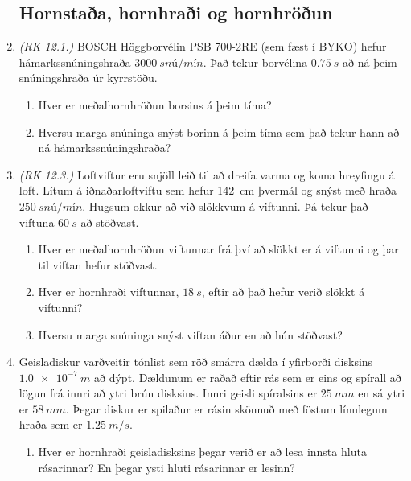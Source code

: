 \begin{enumerate}[label = \textbf{Dæmi \thechapter.\arabic*.}]

\subsection*{Hornstaða, hornhraði og hornhröðun}

\item \textit{(RK 12.1.)} BOSCH Höggborvélin PSB 700-2RE (sem fæst í BYKO) hefur hámarkssnúningshraða $\SI{3000}{snú/mín}$. Það tekur borvélina $\SI{0.75}{s}$ að ná þeim snúningshraða úr kyrrstöðu.
\begin{enumerate}[label = \textbf{(\alph*)}]
    \item Hver er meðalhornhröðun borsins á þeim tíma?
    \item Hversu marga snúninga snýst borinn á þeim tíma sem það tekur hann að ná hámarkssnúningshraða?
\end{enumerate}

\item \textit{(RK 12.3.)} Loftviftur eru snjöll leið til að dreifa varma og koma hreyfingu á loft. Lítum á iðnaðarloftviftu sem hefur \SI{142}{cm} þvermál og snýst með hraða $\SI{250}{snú/mín}$. Hugsum okkur að við slökkvum á viftunni. Þá tekur það viftuna $\SI{60}{s}$ að stöðvast.

\begin{enumerate}[label = \textbf{(\alph*)}]
    \item Hver er meðalhornhröðun viftunnar frá því að slökkt er á viftunni og þar til viftan hefur stöðvast.
    \item Hver er hornhraði viftunnar, $\SI{18}{s}$, eftir að það hefur verið slökkt á viftunni?
    \item Hversu marga snúninga snýst viftan áður en að hún stöðvast?
\end{enumerate}

\item Geisladiskur varðveitir tónlist sem röð smárra dælda í yfirborði disksins $\SI{1.0e-7}{m}$ að dýpt. Dældunum er raðað eftir rás sem er eins og spírall að lögun frá innri að ytri brún disksins. Innri geisli spíralsins er $\SI{25}{mm}$ en sá ytri er $\SI{58}{mm}$. Þegar diskur er spilaður er rásin skönnuð með föstum línulegum hraða sem er $\SI{1.25}{m/s}$.

\begin{enumerate}[label = \textbf{(\alph*)}]
    \item Hver er hornhraði geisladisksins þegar verið er að lesa innsta hluta rásarinnar? En þegar ysti hluti rásarinnar er lesinn?
    

\end{enumerate}
\end{enumerate}
